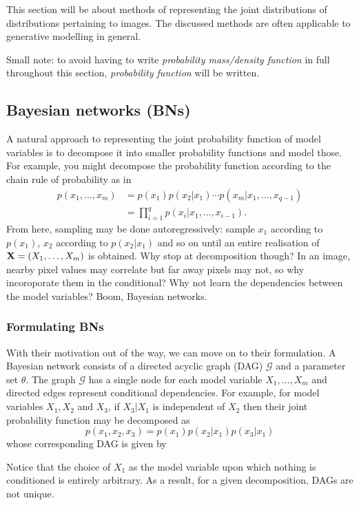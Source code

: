 \documentclass[11pt]{article}
\begin{document}
This section will be about methods of representing the joint distributions of distributions pertaining to images. The discussed methods are often applicable to generative modelling in general.

Small note: to avoid having to write \textit{probability mass/density function} in full throughout this section, \textit{probability function} will be written.

\subsection{\IMPROVE Bayesian networks (BNs)}
A natural approach to representing the joint probability function of model variables is to decompose it into smaller probability functions and model those. For example, you might decompose the probability function according to the chain rule of probability as in
\begin{align*}
    p(x_1,\dots,x_m)
    &=
    p(x_1)p(x_2|x_1)\cdots p(x_m|x_1,\dots,x_{q-1})\\
    &=
    \prod_{i=1}^q p(x_i|x_1,\dots,x_{i-1}).
\end{align*}
From here, sampling may be done autoregressively: sample $x_1$ according to $p(x_1)$, $x_2$ according to $p(x_2|x_1)$ and so on until an entire realisation of $\mathbf{X}=(X_1,\dots,X_m)$ is obtained. Why stop at decomposition though? In an image, nearby pixel values may correlate but far away pixels may not, so why incoroporate them in the conditional? Why not learn the dependencies between the model variables? Boom, Bayesian networks.

\subsubsection{Formulating BNs}
With their motivation out of the way, we can move on to their formulation. A Bayesian network consists of a directed acyclic graph (DAG) $\mathcal{G}$ and a parameter set $\theta$. The graph $\mathcal{G}$ has a single node for each model variable $X_1,\dots,X_m$ and directed edges represent conditional dependencies. For example, for model variables $X_1, X_2$ and $X_3$, if $X_3|X_1$ is independent of $X_2$ then their joint probability function may be decomposed as
$$
p(x_1,x_2,x_3)
=
p(x_1)p(x_2|x_1)p(x_3|x_1)
$$
whose corresponding DAG is given by
\begin{center}
\end{center}
Notice that the choice of $X_1$ as the model variable upon which nothing is conditioned is entirely arbitrary. As a result, for a given decomposition, DAGs are not unique.
\end{document}
